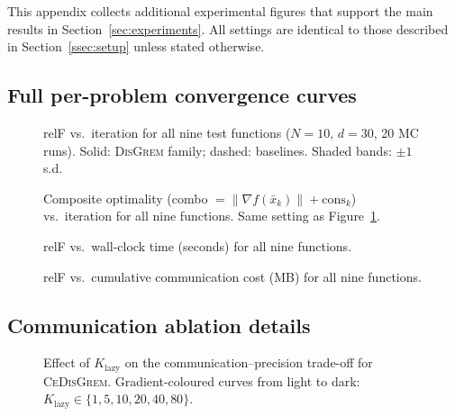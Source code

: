 \documentclass[review,onefignum,onetabnum]{siamart171218}
\begin{document}
This appendix collects additional experimental figures that
support the main results in Section~\ref{sec:experiments}.
All settings are identical to those described in
Section~\ref{ssec:setup} unless stated otherwise.

\subsection{Full per-problem convergence curves}

\begin{figure}[htbp]
	\centering
	\caption{relF vs.\ iteration for all nine test functions
		($N{=}10$, $d{=}30$, 20 MC runs).
		Solid: \textsc{DisGrem} family; dashed: baselines.
		Shaded bands: $\pm 1$ s.d.}
	\label{fig:app_relF_steps}
\end{figure}

\begin{figure}[htbp]
	\centering
	\caption{Composite optimality (combo $=\|\nabla f(\bar x_k)\|+\mathrm{cons}_k$)
		vs.\ iteration for all nine functions.
		Same setting as Figure~\ref{fig:app_relF_steps}.}
	\label{fig:app_combo_steps}
\end{figure}

\begin{figure}[htbp]
	\centering
	\caption{relF vs.\ wall-clock time (seconds) for all nine
		functions.}
	\label{fig:app_relF_time}
\end{figure}

\begin{figure}[htbp]
	\centering
	\caption{relF vs.\ cumulative communication cost (MB) for
		all nine functions.}
	\label{fig:app_relF_comm}
\end{figure}

\subsection{Communication ablation details}

\begin{figure}[htbp]
	\centering
	\caption{Effect of $K_{\mathrm{lazy}}$ on the
		communication--precision trade-off for \textsc{CeDisGrem}.
		Gradient-coloured curves from light to dark:
		$K_{\mathrm{lazy}}\in\{1,5,10,20,40,80\}$.}
	\label{fig:klazy}
\end{figure}
\end{document}
